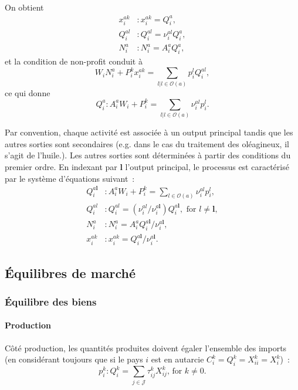 On obtient
\begin{align}
	\label{eq_xiak}x^{ak}_i & : x^{ak}_i = Q_i^a,            \\
	Q_i^{al}                & : Q_i^{al} = \nu_i^{al} Q_i^a, \\
	\label{eq_nia} N_i^a    & :    N_i^a = A_i^a Q_i^a,
\end{align}
et la condition de non-profit conduit à
\begin{equation}
	W_i N_i^a + P_i^k x_i^{ak} = \sum_{{l|l\in \mathcal{O}(a)}} p_i^l Q_i^{al},
\end{equation}
ce qui donne
\begin{equation}\label{eq_qia}
	Q_i^a: A_i^a W_i + P_i^k = \sum_{l|l\in \mathcal{O}(a)} \nu_i^{al} p_i^{l}.
\end{equation}

Par convention, chaque activité est associée à un output principal tandis que les autres sorties sont secondaires (e.g. dans le cas du traitement des oléagineux, il s’agit de l’huile.). Les autres sorties sont déterminées à partir des conditions du premier ordre. En indexant par $\mathbf{l}$ l’output principal, le processus est caractérisé par le système d’équations suivant~:
\begin{align}
	Q_i^{a \mathbf{l}} & : A_i^a W_i + P_i^k = \sum_{l\in \mathcal{O}(a)} \nu_i^{al} p_i^{l},                                             \\
	Q_i^{al}           & : Q_i^{al} = \left( \nu_i^{al} / \nu_i^{a \mathbf{l}} \right)Q_i^{a \mathbf{l}}, \text{ for } l \neq \mathbf{l}, \\
	N_i^a              & : N_i^a = A_i^a Q_i^{a \mathbf{l}} / \nu_i^{a \mathbf{l}},                                                       \\
	x_i^{ak}           & :x_i^{ak} = Q_i^{a \mathbf{l}} / \nu_i^{a \mathbf{l}}.
\end{align}

\subsection{Équilibres de marché}
\subsubsection{Équilibre des biens}
\paragraph{Production} Côté production, les quantités produites doivent égaler l’ensemble des imports (en considérant toujours que si le pays $i$ est en autarcie $C_i^k = Q_i^k = X_{ii}^k = X_i^k$)~:
\begin{equation}
	p_i^k: Q_i^k = \sum_{j \in \mathcal{J}} \tau_{ij}^k X_{ij}^k \text{, for } k \neq 0.
\end{equation}

